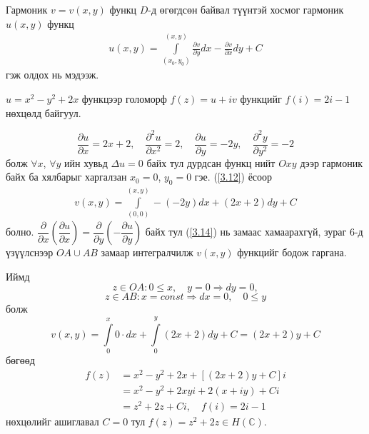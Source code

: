 Гармоник $v=v(x,y)$ функц $D$-д өгөгдсөн байвал түүнтэй хосмог гармоник $u(x,y)$ функц
\begin{eqnarray}
 u(x,y)=\int\limits_{(x_0,y_0)}^{(x,y)} \frac{\partial v}{\partial y}dx-\frac{\partial v}{\partial x}dy+C
\end{eqnarray}
гэж олдох нь мэдээж.
\begin{exm}
 $u=x^2-y^2+2x$ функцээр голоморф $f(z)=u+iv$ функцийг $f(i)=2i-1$ нөхцөлд байгуул.
\end{exm}
\begin{sol}
$$\frac{\partial u}{\partial x}=2x+2,\quad \frac{\partial^2 u}{\partial x^2}=2, \quad \frac{\partial u}{\partial y}=-2y, \quad \frac{\partial^2 y}{\partial y^2}=-2$$ болж $\forall x$, $\forall y$ ийн хувьд $\Delta u=0$ байх тул дурдсан функц нийт $Oxy$ дээр гармоник байх ба хялбарыг харгалзан $x_0=0$, $y_0=0$ гэе.
(\ref{3.12}) ёсоор
\begin{eqnarray} \label{3.14}
 v(x,y)=\int\limits_{(0,0)}^{(x,y)} -(-2y)dx+(2x+2)dy+C
\end{eqnarray} болно. $\dfrac{\partial }{\partial x}\left(\dfrac{\partial u}{\partial x}\right) =\dfrac{\partial }{\partial y}\left( -\dfrac{\partial u}{\partial y}\right)$ 
байх тул (\ref{3.14}) нь замаас хамаарахгүй, зураг 6-д үзүүлснээр $OA\cup AB$ замаар интегралчилж $v(x,y)$ функцийг бодож гаргана. \\

    \begin{figure}[h]
    \centering
{}
        \label{ref hiih ner}
\end{figure}
Иймд 
$$z\in OA: 0\leq x, \quad y=0 \Rightarrow dy=0,$$
$$z\in AB: x=const \Rightarrow dx=0, \quad 0\leq y$$ болж 
$$v(x,y)=\int\limits_0^x 0\cdot dx+\int\limits_0^y (2x+2)dy+C=(2x+2)y+C$$
бөгөөд 
\begin{align*}
    f(z)&=x^2-y^2+2x+[(2x+2)y+C]i\\
    &=x^2-y^2+2xyi+2(x+iy)+Ci \\
    &= z^2+2z+Ci ,\quad f(i)=2i-1
\end{align*}
нөхцөлийг ашиглавал 
$C=0$ тул $f(z)=z^2+2z\in H(\mathbb{C}).$
\end{sol}
